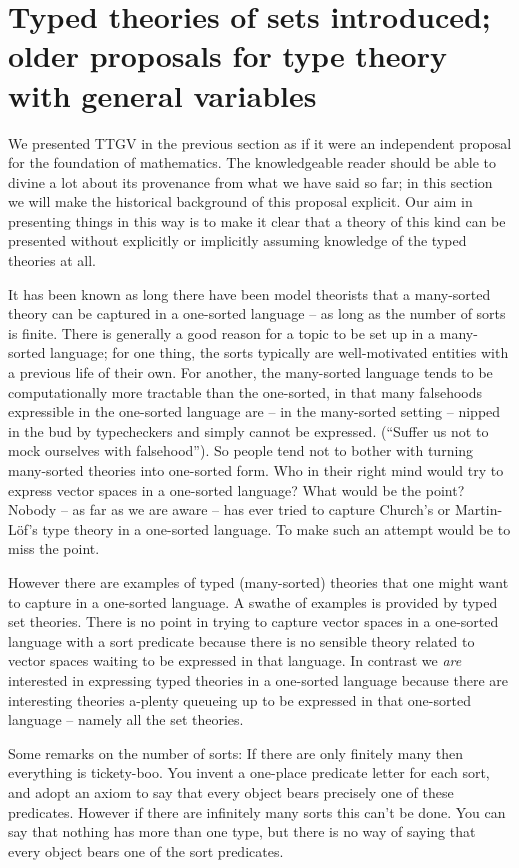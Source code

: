\documentclass[12pt]{article}
\begin{document}
\section{Typed theories of sets introduced;  older proposals for type theory with general variables}\label{earlier}

We presented TTGV in the previous section as if it were an independent
proposal for the foundation of mathematics.  The knowledgeable reader
should be able to divine a lot about its provenance from what we have
said so far; in this section we will make the historical background of
this proposal explicit.  Our aim in presenting things in this way is
to make it clear that a theory of this kind can be presented without
explicitly or implicitly assuming knowledge of the typed theories at all.

It  has been known as long there have been model theorists that a
many-sorted theory can be captured in a one-sorted language -- as long
as the number of sorts is finite.  There is generally a good reason
for a topic to be set up in a many-sorted language; for one thing, the
sorts typically are well-motivated entities with a previous life of
their own.  For another, the many-sorted language tends to be
computationally more tractable than the one-sorted, in that many
falsehoods expressible in the one-sorted language are -- in the
many-sorted setting -- nipped in the bud by typecheckers and simply
cannot be expressed. (``Suffer us not to mock ourselves with
falsehood''). So people tend not to bother with turning many-sorted
theories into one-sorted form. Who in their right mind would try to
express vector spaces in a one-sorted language?  What would be the
point?  Nobody -- as far as we are aware -- has ever tried to
capture Church's or Martin-L\"of's type theory in a one-sorted
language.  To make such an attempt would be to miss the point.

However there are examples of typed (many-sorted) theories that one
might want to capture in a one-sorted language.  A swathe of examples
is provided by typed set theories.  There is no point in trying to
capture vector spaces in a one-sorted language with a sort predicate
because there is no sensible theory related to vector spaces waiting to
be expressed in that language.  In contrast we {\sl are} interested in
expressing typed theories in a one-sorted language because there are
interesting theories a-plenty queueing up to be expressed in that
one-sorted language -- namely all the set theories.

Some remarks on the number of sorts: If there are only finitely many
then everything is tickety-boo. You invent a one-place predicate
letter for each sort, and adopt an axiom to say that every object
bears precisely one of these predicates.  However if there are
infinitely many sorts this can't be done. You can say that nothing has
more than one type, but there is no way of saying that every object
bears one of the sort predicates.
\end{document}
